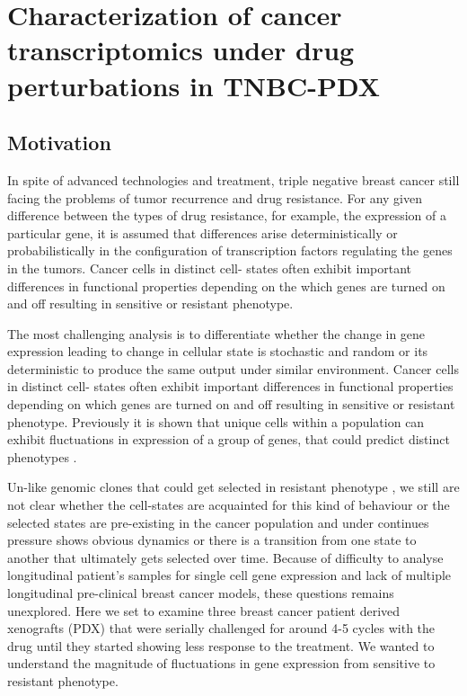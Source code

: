 
{\chapter{Characterization of cancer transcriptomics under drug perturbations in TNBC-PDX}

}
 \label{ch:Chapter5}
 \section{Motivation}

In spite of advanced technologies and treatment, triple negative breast cancer still facing the problems of tumor recurrence and drug resistance.
For any given difference between the types of drug resistance, for example, the expression of a particular gene, it is assumed that differences arise deterministically or probabilistically in the configuration of transcription factors regulating the genes in the tumors. Cancer cells in distinct cell- states often exhibit important differences in functional properties depending on the which genes are turned on and off resulting in sensitive or resistant phenotype.

The most challenging analysis is to differentiate whether the change in gene expression leading to change in cellular state is stochastic\cite{raj2008nature} and random or its deterministic to produce the same output under similar environment.
Cancer cells in distinct cell- states often exhibit important differences in functional properties depending on which genes are turned on and off resulting in sensitive  or resistant phenotype.
Previously it is shown that unique cells within a population can exhibit fluctuations in expression of a group of genes, that could predict distinct phenotypes \cite{shaffer2019memory}.

Un-like genomic clones that could get selected in resistant phenotype \cite{salehi2020single}, we still are not clear whether the cell-states are acquainted for this kind of behaviour or the selected states are pre-existing in the cancer population and under continues pressure shows obvious dynamics or there is a transition from one state to another that ultimately gets selected over time. Because of difficulty to analyse longitudinal patient's samples for single cell gene expression and lack of multiple longitudinal pre-clinical breast cancer models, these questions remains unexplored. Here we set to examine three breast cancer patient derived xenografts (PDX) that were serially challenged for around 4-5 cycles with the drug until they started showing less response to the treatment. We wanted to understand the magnitude of fluctuations in gene expression from sensitive to resistant phenotype.


